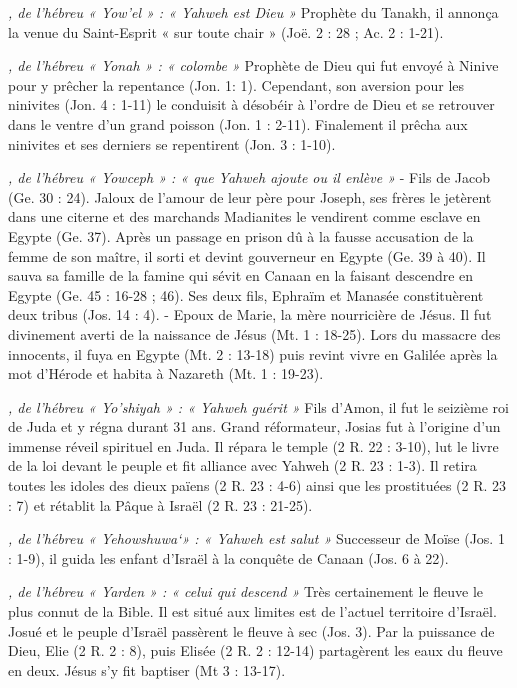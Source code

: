 \begin{multicols}{2}
\textit{, de l'hébreu « Yow'el » : « Yahweh est Dieu »}\newline
Prophète du Tanakh, il annonça la venue du Saint-Esprit « sur toute chair » (Joë. 2 : 28 ; Ac. 2 : 1-21).

\textit{, de l'hébreu « Yonah » : « colombe »}\newline
Prophète de Dieu qui fut envoyé à Ninive pour y prêcher la repentance (Jon. 1: 1). Cependant, son aversion pour les ninivites (Jon. 4 : 1-11) le conduisit à désobéir à l'ordre de Dieu et se retrouver dans le ventre d'un grand poisson (Jon. 1 : 2-11). Finalement il prêcha aux ninivites et ses derniers se repentirent (Jon. 3 : 1-10).

\textit{, de l'hébreu « Yowceph » : « que Yahweh ajoute ou il enlève »}\newline
- Fils de Jacob (Ge. 30 : 24). Jaloux de l'amour de leur père pour Joseph, ses frères le jetèrent dans une citerne et des marchands Madianites le vendirent comme esclave en Egypte (Ge. 37). Après un passage en prison dû à la fausse accusation de la femme de son maître, il sorti et devint gouverneur en Egypte (Ge. 39 à 40). Il sauva sa famille de la famine qui sévit en Canaan en la faisant descendre en Egypte (Ge. 45 : 16-28 ; 46). Ses deux fils, Ephraïm et Manasée constituèrent deux tribus (Jos. 14 : 4).
- Epoux de Marie, la mère nourricière de Jésus. Il fut divinement averti de la naissance de Jésus (Mt. 1 : 18-25). Lors du massacre des innocents, il fuya en Egypte (Mt. 2 : 13-18) puis revint vivre en Galilée après la mot d'Hérode et habita à Nazareth (Mt. 1 : 19-23).

\textit{, de l'hébreu « Yo'shiyah » : « Yahweh guérit »}\newline
Fils d'Amon, il fut le seizième roi de Juda et y régna durant 31 ans.
Grand réformateur, Josias fut à l'origine d'un immense réveil spirituel en Juda. Il répara le temple (2 R. 22 : 3-10), lut le livre de la loi devant le peuple et fit alliance avec Yahweh (2 R. 23 : 1-3). Il retira toutes les idoles des dieux païens (2 R. 23 : 4-6) ainsi que les prostituées (2 R. 23 : 7) et rétablit la Pâque à Israël (2 R. 23 : 21-25).

\textit{, de l'hébreu « Yehowshuwa`» : « Yahweh est salut »}\newline
Successeur de Moïse (Jos. 1 : 1-9), il guida les enfant d'Israël à la conquête de Canaan (Jos. 6 à 22).

\textit{, de l'hébreu « Yarden » : « celui qui descend »}\newline
Très certainement le fleuve le plus connut de la Bible. Il est situé aux limites est de l'actuel territoire d'Israël. Josué et le peuple d'Israël passèrent le fleuve à sec (Jos. 3).
Par la puissance de Dieu, Elie (2 R. 2 : 8), puis Elisée (2 R. 2 : 12-14) partagèrent les eaux du fleuve en deux. Jésus s'y fit baptiser (Mt 3 : 13-17).


\end{multicols}
